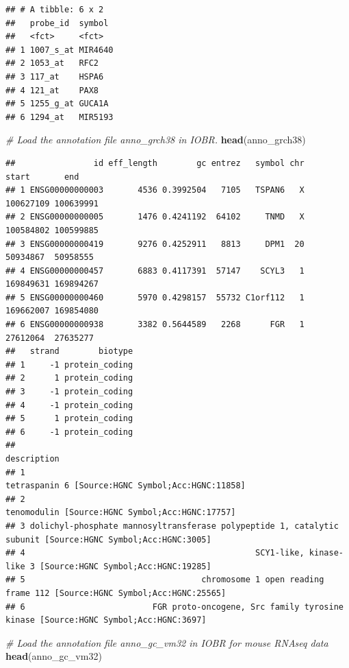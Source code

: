 \documentclass[
  12pt,
]{book}
\newenvironment{Shaded}{\begin{snugshade}}{\end{snugshade}}
\newcommand{\CommentTok}[1]{\textcolor[rgb]{0.56,0.35,0.01}{\textit{#1}}}
\newcommand{\FunctionTok}[1]{\textcolor[rgb]{0.13,0.29,0.53}{\textbf{#1}}}
\newcommand{\NormalTok}[1]{#1}
\begin{document}
\begin{verbatim}
## # A tibble: 6 x 2
##   probe_id  symbol 
##   <fct>     <fct>  
## 1 1007_s_at MIR4640
## 2 1053_at   RFC2   
## 3 117_at    HSPA6  
## 4 121_at    PAX8   
## 5 1255_g_at GUCA1A 
## 6 1294_at   MIR5193
\end{verbatim}

\begin{Shaded}
\begin{Highlighting}[]
\CommentTok{\# Load the annotation file \textasciigrave{}anno\_grch38\textasciigrave{} in IOBR.}
\FunctionTok{head}\NormalTok{(anno\_grch38)}
\end{Highlighting}
\end{Shaded}

\begin{verbatim}
##                id eff_length        gc entrez   symbol chr     start       end
## 1 ENSG00000000003       4536 0.3992504   7105   TSPAN6   X 100627109 100639991
## 2 ENSG00000000005       1476 0.4241192  64102     TNMD   X 100584802 100599885
## 3 ENSG00000000419       9276 0.4252911   8813     DPM1  20  50934867  50958555
## 4 ENSG00000000457       6883 0.4117391  57147    SCYL3   1 169849631 169894267
## 5 ENSG00000000460       5970 0.4298157  55732 C1orf112   1 169662007 169854080
## 6 ENSG00000000938       3382 0.5644589   2268      FGR   1  27612064  27635277
##   strand        biotype
## 1     -1 protein_coding
## 2      1 protein_coding
## 3     -1 protein_coding
## 4     -1 protein_coding
## 5      1 protein_coding
## 6     -1 protein_coding
##                                                                                                  description
## 1                                                          tetraspanin 6 [Source:HGNC Symbol;Acc:HGNC:11858]
## 2                                                            tenomodulin [Source:HGNC Symbol;Acc:HGNC:17757]
## 3 dolichyl-phosphate mannosyltransferase polypeptide 1, catalytic subunit [Source:HGNC Symbol;Acc:HGNC:3005]
## 4                                               SCY1-like, kinase-like 3 [Source:HGNC Symbol;Acc:HGNC:19285]
## 5                                    chromosome 1 open reading frame 112 [Source:HGNC Symbol;Acc:HGNC:25565]
## 6                          FGR proto-oncogene, Src family tyrosine kinase [Source:HGNC Symbol;Acc:HGNC:3697]
\end{verbatim}

\begin{Shaded}
\begin{Highlighting}[]
\CommentTok{\# Load the annotation file \textasciigrave{}anno\_gc\_vm32\textasciigrave{} in IOBR for mouse RNAseq data}
\FunctionTok{head}\NormalTok{(anno\_gc\_vm32)}
\end{Highlighting}
\end{Shaded}
\end{document}
